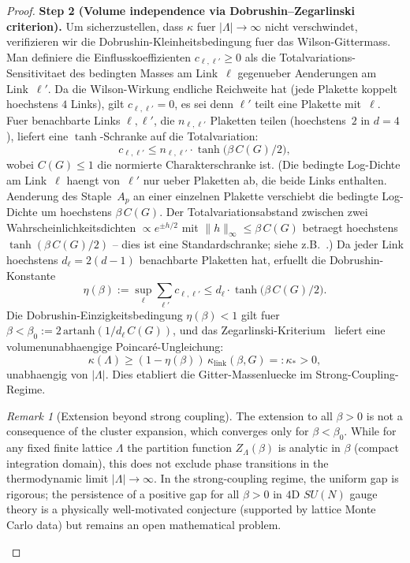 \documentclass[12pt,a4paper]{article}
\theoremstyle{definition}
\theoremstyle{plain}
\theoremstyle{remark}
\newtheorem{remark}[definition]{Remark}
\begin{document}
\begin{proof}
\medskip
\noindent\textbf{Step 2 (Volume independence via Dobrushin--Zegarlinski criterion).}
Um sicherzustellen, dass $\kappa$ fuer $|\Lambda| \to \infty$ nicht verschwindet, verifizieren wir die Dobrushin-Kleinheitsbedingung fuer das Wilson-Gittermass. Man definiere die Einflusskoeffizienten $c_{\ell,\ell'} \geq 0$ als die Totalvariations-Sensitivitaet des bedingten Masses am Link~$\ell$ gegenueber Aenderungen am Link~$\ell'$. Da die Wilson-Wirkung endliche Reichweite hat (jede Plakette koppelt hoechstens $4$ Links), gilt $c_{\ell,\ell'} = 0$, es sei denn $\ell'$ teilt eine Plakette mit~$\ell$. Fuer benachbarte Links $\ell, \ell'$, die $n_{\ell,\ell'}$ Plaketten teilen (hoechstens~$2$ in $d=4$), liefert eine $\tanh$-Schranke auf die Totalvariation:
\begin{equation}
    c_{\ell,\ell'} \leq n_{\ell,\ell'} \cdot \tanh\!\bigl(\beta\,C(G)/2\bigr),
\end{equation}
wobei $C(G) \leq 1$ die normierte Charakterschranke ist. (Die bedingte Log-Dichte am Link~$\ell$ haengt von~$\ell'$ nur ueber Plaketten ab, die beide Links enthalten. Aenderung des Staple~$A_p$ an einer einzelnen Plakette verschiebt die bedingte Log-Dichte um hoechstens $\beta\,C(G)$. Der Totalvariationsabstand zwischen zwei Wahrscheinlichkeitsdichten $\propto e^{\pm h/2}$ mit $\|h\|_\infty \leq \beta\,C(G)$ betraegt hoechstens $\tanh(\beta\,C(G)/2)$ -- dies ist eine Standardschranke; siehe z.B.\ \cite{DobrushinShlosman1985}.) Da jeder Link hoechstens $d_\ell = 2(d-1)$ benachbarte Plaketten hat, erfuellt die Dobrushin-Konstante
\begin{equation}
    \eta(\beta) := \sup_\ell \sum_{\ell'} c_{\ell,\ell'} \leq d_\ell \cdot \tanh\!\bigl(\beta\,C(G)/2\bigr).
\end{equation}
Die Dobrushin-Einzigkeitsbedingung $\eta(\beta) < 1$ gilt fuer $\beta < \beta_0 := 2\,\mathrm{artanh}(1/d_\ell\,C(G))$, und das Zegarlinski-Kriterium~\cite{Zegarlinski1990} liefert eine volumenunabhaengige Poincar\'e-Ungleichung:
\begin{equation}
    \kappa(\Lambda) \geq (1 - \eta(\beta))\,\kappa_{\mathrm{link}}(\beta, G) =: \kappa_* > 0,
\end{equation}
unabhaengig von $|\Lambda|$. Dies etabliert die Gitter-Massenluecke im Strong-Coupling-Regime.

\begin{remark}[Extension beyond strong coupling]\label{rem:all-beta}
The extension to all $\beta > 0$ is not a consequence of the cluster expansion, which converges only for $\beta < \beta_0$. While for any fixed finite lattice $\Lambda$ the partition function $Z_\Lambda(\beta)$ is analytic in $\beta$ (compact integration domain), this does not exclude phase transitions in the thermodynamic limit $|\Lambda| \to \infty$. In the strong-coupling regime, the uniform gap is rigorous; the persistence of a positive gap for all $\beta > 0$ in $4$D $SU(N)$ gauge theory is a physically well-motivated conjecture (supported by lattice Monte Carlo data) but remains an open mathematical problem.
\end{remark}


\end{proof}
\end{document}
